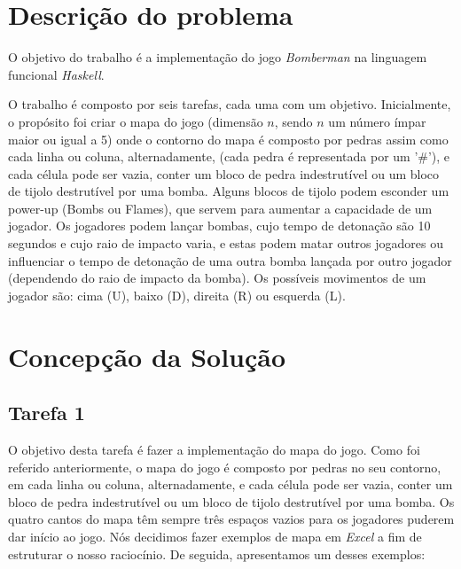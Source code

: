 \documentclass[a4paper]{article}
\begin{document}
\newpage

\section{Descrição do problema}
O objetivo do trabalho é a implementação do jogo \emph{Bomberman} na linguagem funcional \emph{Haskell}.\par O trabalho é composto por seis tarefas, cada uma com um objetivo. Inicialmente, o propósito foi criar o mapa do jogo (dimensão $n$, sendo $n$ um número ímpar maior ou igual a 5) onde o contorno do mapa é composto por pedras assim como cada linha ou coluna, alternadamente, (cada pedra é representada por um '\#'), e cada célula pode ser vazia, conter um bloco de pedra indestrutível ou um bloco de tijolo destrutível por uma bomba. Alguns blocos de tijolo podem esconder um power-up (Bombs ou Flames), que servem para aumentar a capacidade de um jogador. Os jogadores podem lançar bombas, cujo tempo de detonação são 10 segundos e cujo raio de impacto varia, e estas podem matar outros jogadores ou influenciar o tempo de detonação de uma outra bomba lançada por outro jogador (dependendo do raio de impacto da bomba). Os possíveis movimentos de um jogador são: cima (U), baixo (D), direita (R) ou esquerda (L).  

\vspace{0.5cm}
\section{Concepção da Solução}
\label{sec:solucao}

\subsection{Tarefa 1} O objetivo desta tarefa é fazer a implementação do mapa do jogo. Como foi referido anteriormente, o mapa do jogo é composto por pedras no seu contorno, em cada linha ou coluna, alternadamente, e cada célula pode ser vazia, conter um bloco de pedra indestrutível ou um bloco de tijolo destrutível por uma bomba. Os quatro cantos do mapa têm sempre três espaços vazios para os jogadores puderem dar início ao jogo. Nós decidimos fazer exemplos de mapa em \emph{Excel} a fim de estruturar o nosso raciocínio. De seguida, apresentamos um desses exemplos:
\end{document}
